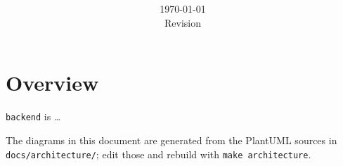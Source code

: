 \documentclass[a4paper,11pt]{article}
\title{\texttt{\projectname}\\[0.3em]\large \projectsubtitle}
\author{}
\date{\today\\[0.3em]\small Revision \texttt{\docversion}}
\newcommand{\projectname}{backend}
\begin{document}
\maketitle
\thispagestyle{empty}

\section*{Overview}

\texttt{\projectname} is \ldots

The diagrams in this document are generated from the PlantUML sources in
\texttt{docs/architecture/}; edit those and rebuild with \texttt{make architecture}.

\clearpage
\tableofcontents
\listoffigures

\end{document}
